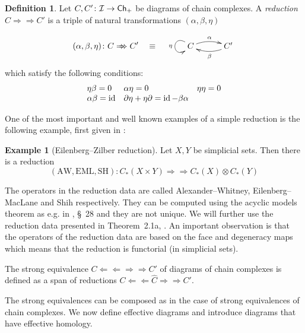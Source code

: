 \documentclass[12pt,a4wide]{article}
\theoremstyle{plain}
\theoremstyle{definition}
\newtheorem{Def}[thm]{Definition}
\newtheorem{ex}[thm]{Example}
\renewcommand\:{\colon}
\def\bo{\partial} %
\def\EML{\mathrm{EML}}
\def\AW{\mathrm{AW}}
\def\SH{\mathrm{SH}}
\newcommand{\dC}{{C}}
\newcommand{\icat}{\mathcal I}
\newcommand\Redu{\Rightarrow\!\!\!\!\Rightarrow}
\newcommand\lredu{\Leftarrow\!\!\!\!\Leftarrow}
\newcommand{\steq}{\Leftarrow\!\!\!\!\Leftarrow\!\!\!\!\Rightarrow\!\!\!\!\Rightarrow}
\begin{document}
\begin{Def}
Let $\dC,\dC' \colon \icat \to \Ch_+$ be diagrams of chain complexes. A \emph{reduction} $\dC \Redu \dC'$  is a triple of natural transformations  $(\alpha,\beta,\eta)$ 

\[(\alpha,\beta,\eta)\: \dC\Redu \dC'\quad\equiv\quad\xymatrix@C=30pt{
\dC \ar@(ul,dl)[]_{\eta} \ar@/^/[r]^\alpha & \dC' \ar@/^/[l]^{\beta}
}\]
which satisfy the following conditions:
\begin{equation}\label{eq:reduction}
\begin{array}{lll}
 \eta\beta = 0 & \alpha \eta = 0&  \eta\eta = 0  \\
\alpha \beta  = \id & \bo\eta + \eta \bo = \id - \beta\alpha&
\end{array}
\end{equation}

One of the most important and well known examples of a simple reduction is the following example, first given in  \cite{eml1, eml2}:
\begin{ex}[Eilenberg--Zilber reduction]\label{p:EZred}
Let $X,Y$ be simplicial sets. Then there is a reduction
\[
(\AW, \EML, \SH)\: C_*(X \times Y) \Redu C_*(X) \otimes C_*(Y)
\]
\end{ex}

The operators in the reduction data are called Alexander--Whitney, Eilenberg--MacLane and Shih respectively. They can be computed using the acyclic models theorem as e.g. in \cite{may}, §~28 and they are not unique. We will further use the reduction data presented in Theorem~2.1a, \cite{eml1}. An important observation is that the operators of the reduction data are based on the face and degeneracy maps which means that the reduction is functorial (in simplicial sets). 



The strong equivalence $\dC \steq \dC'$ of diagrams of chain complexes is defined as a span of reductions $\dC\lredu \widehat{\dC}\Redu \dC'$.
\end{Def}
The strong equivalences can be composed as in the case of strong equivalences of chain complexes. We now define effective diagrams and introduce diagrams that have effective homology.
\end{document}
